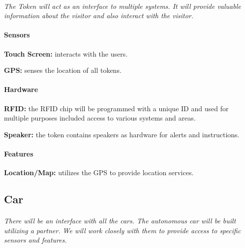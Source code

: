 \documentclass[12pt]{article}
\begin{document}
	\paragraph{} \textit{The Token will act as an interface to multiple systems. 
	It will provide valuable information about the visitor and also interact with 
	the visitor. }
		
	\paragraph{Sensors}
	\begin{list}{}{}
		\item \textbf{Touch Screen: } interacts with the users. 
		\item \textbf{GPS: } senses the location of all tokens.
	\end{list}
		
	\paragraph{Hardware}
	\begin{list}{}{}
		\item \textbf{RFID: }the RFID chip will be programmed with a unique ID and 
		used for multiple purposes included access to various systems and areas.
		\item \textbf{Speaker: }the token contains speakers as hardware for alerts 
		and instructions.
	\end{list}

	\paragraph{Features}
	\begin{list}{}{}
		\item \textbf{Location/Map: }utilizes the GPS to provide location services.
	\end{list}

	\subsection{Car}
	\paragraph{} \textit{There will be an interface with all the cars. The autonomous 
	car will be built utilizing a partner. We will work closely with them to provide 
	access to specific sensors and features.}		
	
\end{document}
